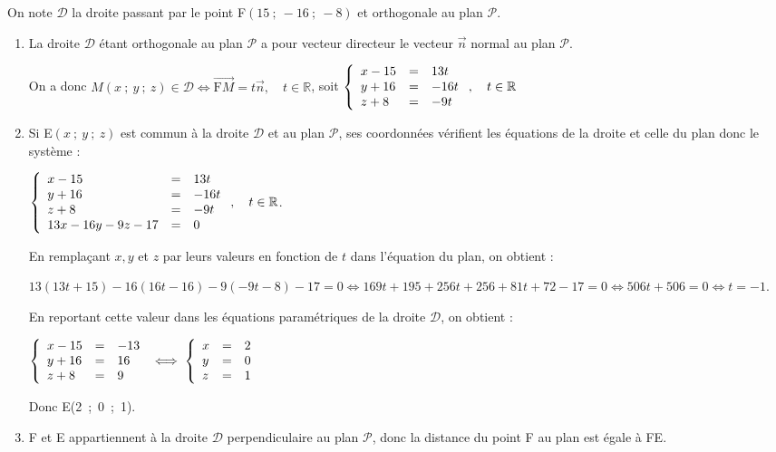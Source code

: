 \documentclass[10pt]{article}
\providecommand{\R}{\mathbb{R}}
\providecommand{\vect}[1]{\overrightarrow{#1}}
\begin{document}
On note $\mathcal{D}$ la droite passant par le point F$(15~;~-16~;~-8)$ et orthogonale au plan $\mathcal{P}$.
\begin{enumerate}[resume]
\item 
La droite $\mathcal{D}$ étant orthogonale au plan $\mathcal{P}$ a pour vecteur directeur le vecteur $\vect{n}$ normal au plan $\mathcal{P}$.

On a donc $M(x~;~y~;~z) \in \mathcal{D} \iff \vect{\text{F}M} = t \vect{n}, \quad t \in \R$, soit $\left\{\begin{array}{l c l}
x - 15&=&13t\\
y + 16&=&- 16t\\
z + 8&=&- 9t
\end{array}\right., \quad t \in \R$
\item 
Si E$(x~;~y~;~z)$ est commun à la droite $\mathcal{D}$ et au plan $\mathcal{P}$, ses coordonnées vérifient les équations de la droite et celle du plan donc le système :

$\left\{\begin{array}{l c l}
x - 15&=&13t\\
y + 16&=&- 16t\\
z + 8&=&- 9t\\
13x - 16y - 9z - 17 &=& 0
\end{array}\right., \quad t \in \R$.

En remplaçant $x, y$ et $z$ par leurs valeurs en fonction de $t$ dans l'équation du plan, on obtient :

$13(13t + 15) - 16(16t - 16)- 9(- 9t - 8) - 17 = 0 \iff 169t + 195 + 256t + 256 +81t + 72 - 17 = 0 \iff 506t + 506 = 0 \iff t = - 1$.

En reportant cette valeur dans les équations paramétriques de la droite $\mathcal{D}$, on obtient  :

$\left\{\begin{array}{l c l}
x - 15&=&-13 \\
y + 16&=&16\\
z + 8&=&9\\
\end{array}\right.\iff \left\{\begin{array}{l c l}
x &=&2 \\
y &=&0\\
z &=&1\\
\end{array}\right.$

Donc E(2~;~0~;~1).

\item 
F et E appartiennent à la droite $\mathcal{D}$ perpendiculaire au plan $\mathcal{P}$, donc la distance du point F au plan est égale à FE.


\end{enumerate}
\end{document}
